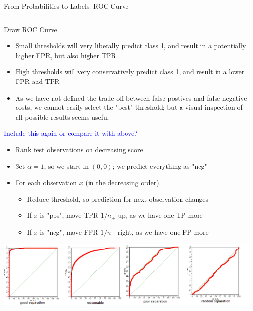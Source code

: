 \documentclass[11pt,compress,t,notes=noshow, xcolor=table]{beamer}
\newenvironment{knitrout}{}{} %
\begin{document}
\begin{vbframe}{From Probabilities to Labels: ROC Curve}
\begin{columns}
\begin{column}{0.45\textwidth}
\begin{knitrout}
{}



\end{knitrout}


\end{column}
\end{columns}

\end{vbframe}



 \begin{vbframe}{Draw ROC Curve}

 
 \begin{itemize}
\item Small thresholds will very liberally predict class 1, and result in a potentially higher FPR, but also higher TPR
  \item High thresholds will very conservatively predict class 1, and result in a lower FPR and TPR
  \item As we have not defined the trade-off between false postives and false negative costs,
    we cannot easily select the "best" threshold; but a visual inspection of all possible results seems useful
\end{itemize}

\textcolor{blue}{Include this again or compare it with above?}
 \begin{itemize}
   \item Rank test observations on decreasing score
   \item Set $\alpha=1$, so we start in $(0, 0)$; we predict everything as "neg"
   \item For each observation $x$ (in the decreasing order).
   \begin{itemize}
     \item Reduce threshold, so prediction for next observation changes
     \item If $x$ is "pos", move TPR $1/n_+$ up, as we have one TP more
     \item If $x$ is "neg", move FPR $1/n_-$ right, as we have one FP more
   \end{itemize}
 \end{itemize}

\color{green}{ Include this picture?}
 
  \begin{center}
 \includegraphics[width=\textwidth]{figure_man/roc-curves2.png}
 \end{center}
 
 
 \end{vbframe}
\end{document}
